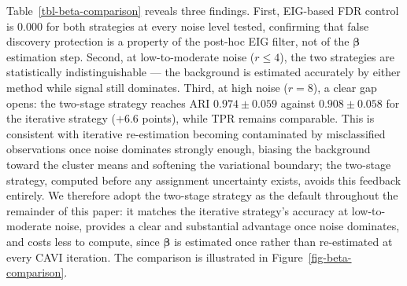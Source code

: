 \documentclass[
  letterpaper,
  DIV=11,
  numbers=noendperiod]{scrartcl}
\begin{document}
\begin{table}

\caption{\label{tbl-beta-comparison}Comparison of \(\bm{\beta}\)
estimation strategies across noise levels (\(n = 200\),
\(J_{\text{act}} = 12\), \(K_0 = 3\), mean over 5 replications). Bold
indicates the better-performing strategy where the gap is meaningful.}


\end{table}%

Table~\ref{tbl-beta-comparison} reveals three findings. First, EIG-based
FDR control is \(0.000\) for both strategies at every noise level
tested, confirming that false discovery protection is a property of the
post-hoc EIG filter, not of the \(\bm{\beta}\) estimation step. Second,
at low-to-moderate noise (\(r \le 4\)), the two strategies are
statistically indistinguishable --- the background is estimated
accurately by either method while signal still dominates. Third, at high
noise (\(r = 8\)), a clear gap opens: the two-stage strategy reaches ARI
\(0.974 \pm 0.059\) against \(0.908 \pm 0.058\) for the iterative
strategy (\(+6.6\) points), while TPR remains comparable. This is
consistent with iterative re-estimation becoming contaminated by
misclassified observations once noise dominates strongly enough, biasing
the background toward the cluster means and softening the variational
boundary; the two-stage strategy, computed before any assignment
uncertainty exists, avoids this feedback entirely. We therefore adopt
the two-stage strategy as the default throughout the remainder of this
paper: it matches the iterative strategy's accuracy at low-to-moderate
noise, provides a clear and substantial advantage once noise dominates,
and costs less to compute, since \(\bm{\beta}\) is estimated once rather
than re-estimated at every CAVI iteration. The comparison is illustrated
in Figure~\ref{fig-beta-comparison}.
\end{document}
